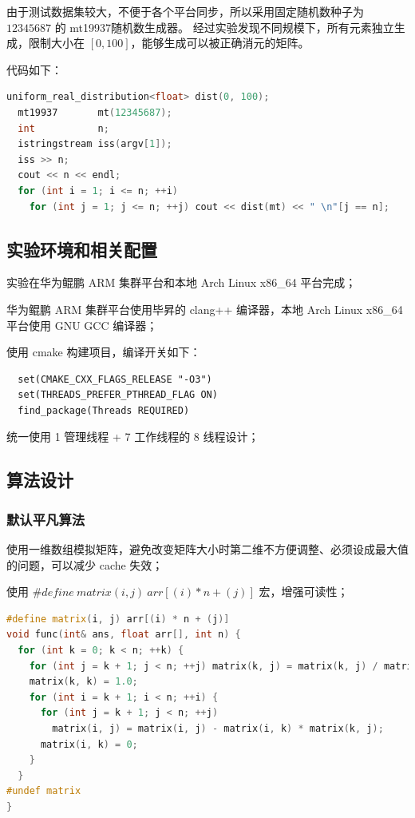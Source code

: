 \documentclass[a4paper]{article}
\begin{document}
由于测试数据集较大，不便于各个平台同步，所以采用固定随机数种子为 $12345687$ 的 mt19937随机数生成器。
经过实验发现不同规模下，所有元素独立生成，限制大小在 $[0, 100]$，能够生成可以被正确消元的矩阵。

代码如下：

\begin{lstlisting}[title=测试数据集生成器,frame=trbl,language={C++}]
  uniform_real_distribution<float> dist(0, 100);
  mt19937       mt(12345687);
  int           n;
  istringstream iss(argv[1]);
  iss >> n;
  cout << n << endl;
  for (int i = 1; i <= n; ++i)
    for (int j = 1; j <= n; ++j) cout << dist(mt) << " \n"[j == n];
\end{lstlisting}

\subsection{实验环境和相关配置}

实验在华为鲲鹏 ARM 集群平台和本地 Arch Linux x86\_64 平台完成；

华为鲲鹏 ARM 集群平台使用毕昇的 clang++ 编译器，本地 Arch Linux x86\_64 平台使用 GNU GCC 编译器；

使用 cmake 构建项目，编译开关如下：

\begin{verbatim}
  set(CMAKE_CXX_FLAGS_RELEASE "-O3")
  set(THREADS_PREFER_PTHREAD_FLAG ON)
  find_package(Threads REQUIRED)
\end{verbatim}

统一使用 1 管理线程 + 7 工作线程的 8 线程设计；

\subsection{算法设计}

\subsubsection{默认平凡算法}

使用一维数组模拟矩阵，避免改变矩阵大小时第二维不方便调整、必须设成最大值的问题，可以减少 cache 失效；

使用 $\#define\ matrix(i, j)\ arr[(i) * n + (j)]$ 宏，增强可读性；

\begin{lstlisting}[title=平凡算法,frame=trbl,language={C++}]
#define matrix(i, j) arr[(i) * n + (j)]
void func(int& ans, float arr[], int n) {
  for (int k = 0; k < n; ++k) {
    for (int j = k + 1; j < n; ++j) matrix(k, j) = matrix(k, j) / matrix(k, k);
    matrix(k, k) = 1.0;
    for (int i = k + 1; i < n; ++i) {
      for (int j = k + 1; j < n; ++j)
        matrix(i, j) = matrix(i, j) - matrix(i, k) * matrix(k, j);
      matrix(i, k) = 0;
    }
  }
#undef matrix
}
\end{lstlisting}
\end{document}
